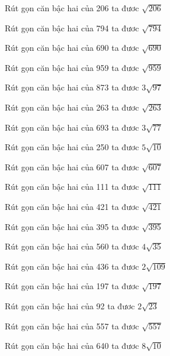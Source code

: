 \documentclass[12pt,a4paper]{article}
\begin{document}
\begin{ex}
Rút gọn căn bậc hai của 206 ta đươc $\sqrt{206}$
\end{ex}
\begin{ex}
Rút gọn căn bậc hai của 794 ta đươc $\sqrt{794}$
\end{ex}
\begin{ex}
Rút gọn căn bậc hai của 690 ta đươc $\sqrt{690}$
\end{ex}
\begin{ex}
Rút gọn căn bậc hai của 959 ta đươc $\sqrt{959}$
\end{ex}
\begin{ex}
Rút gọn căn bậc hai của 873 ta đươc $3\sqrt{97}$
\end{ex}
\begin{ex}
Rút gọn căn bậc hai của 263 ta đươc $\sqrt{263}$
\end{ex}
\begin{ex}
Rút gọn căn bậc hai của 693 ta đươc $3\sqrt{77}$
\end{ex}
\begin{ex}
Rút gọn căn bậc hai của 250 ta đươc $5\sqrt{10}$
\end{ex}
\begin{ex}
Rút gọn căn bậc hai của 607 ta đươc $\sqrt{607}$
\end{ex}
\begin{ex}
Rút gọn căn bậc hai của 111 ta đươc $\sqrt{111}$
\end{ex}
\begin{ex}
Rút gọn căn bậc hai của 421 ta đươc $\sqrt{421}$
\end{ex}
\begin{ex}
Rút gọn căn bậc hai của 395 ta đươc $\sqrt{395}$
\end{ex}
\begin{ex}
Rút gọn căn bậc hai của 560 ta đươc $4\sqrt{35}$
\end{ex}
\begin{ex}
Rút gọn căn bậc hai của 436 ta đươc $2\sqrt{109}$
\end{ex}
\begin{ex}
Rút gọn căn bậc hai của 197 ta đươc $\sqrt{197}$
\end{ex}
\begin{ex}
Rút gọn căn bậc hai của 92 ta đươc $2\sqrt{23}$
\end{ex}
\begin{ex}
Rút gọn căn bậc hai của 557 ta đươc $\sqrt{557}$
\end{ex}
\begin{ex}
Rút gọn căn bậc hai của 640 ta đươc $8\sqrt{10}$
\end{ex}
\end{document}
